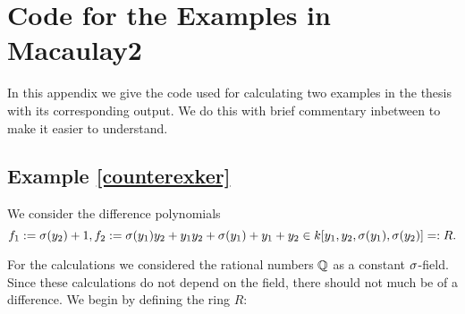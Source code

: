 



\section{Code for the Examples in Macaulay2}\label{appendixcode}

In this appendix we give the code used for calculating two examples in the thesis with its corresponding output. We do this with brief commentary inbetween to make it easier to understand.

\subsection{Example \ref{counterexker}}
We consider the difference polynomials $$f_1 := \sigma(y_2) + 1, f_2:= \sigma(y_1)y_2 + y_1y_2 + \sigma(y_1) + y_1 + y_2 \in k[y_1,y_2,\sigma(y_1),\sigma(y_2)] =: R.$$

For the calculations we considered the rational numbers $\mathbb{Q}$ as a constant $\sigma$-field. Since these calculations do not depend on the field, there should not much be of a difference. We begin by defining the ring $R$:

